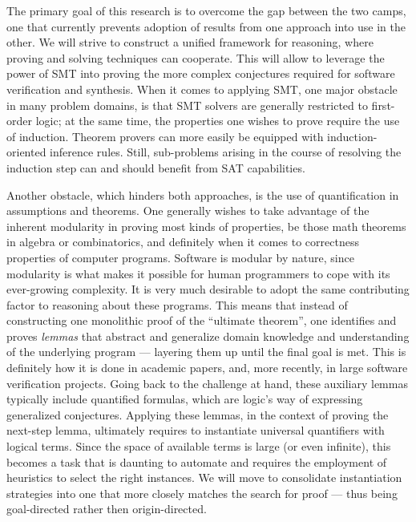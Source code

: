 \medskip
The primary goal of this research is to overcome the gap between the two camps,
one that currently prevents adoption of results from one approach into use in
the other.
We will strive to construct a unified framework for reasoning, where proving
and solving techniques can cooperate.
This will allow to leverage the power of SMT into proving the more complex
conjectures required for software verification and synthesis.
When it comes to applying SMT, one major obstacle in many problem domains, is
that SMT solvers are generally restricted to first-order logic; at the same time,
the properties one wishes to prove require the use of induction.
Theorem provers can more easily be equipped with induction-oriented inference
rules.
Still, sub-problems arising in the course of resolving the induction step can
and should benefit from SAT capabilities.

Another obstacle, which hinders both approaches, is the use of quantification
in assumptions and theorems.
One generally wishes to take advantage of the inherent modularity in proving
most kinds of properties, be those math theorems in algebra or combinatorics,
and definitely when it comes to correctness properties of computer programs.
Software is modular by nature, since modularity is what makes it possible
for human programmers to cope with its ever-growing complexity.
It is very much desirable to adopt the same contributing factor to reasoning about
these programs.
This means that instead of constructing one monolithic proof of the ``ultimate
theorem'', one identifies and proves \emph{lemmas} that abstract and generalize
domain knowledge and understanding of the underlying program --- layering them
up until the final goal is met.
This is definitely how it is done in academic papers, and, more recently, in
large software verification projects.
Going back to the challenge at hand, these auxiliary lemmas typically include
quantified formulas, which are logic's way of expressing generalized conjectures.
Applying these lemmas, \eg in the context of proving the next-step lemma,
ultimately requires to instantiate universal quantifiers with logical terms.
Since the space of available terms is large (or even infinite), this becomes
a task that is daunting to automate and requires the employment of heuristics
to select the right instances.
We will move to consolidate instantiation strategies into one that more closely
matches the search for proof --- thus being goal-directed rather then origin-directed.

